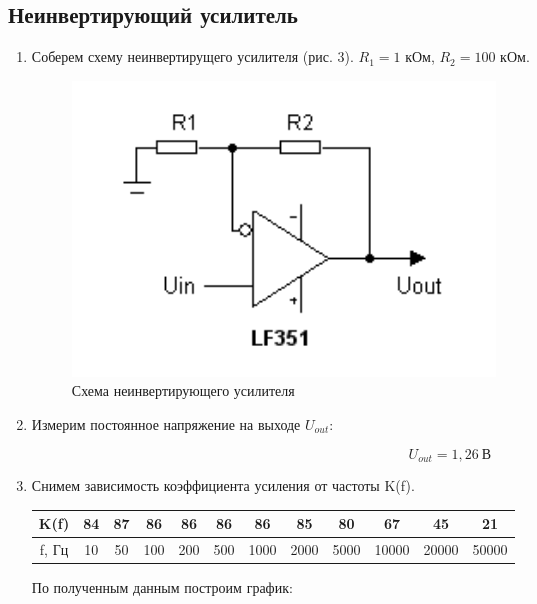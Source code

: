\documentclass[a4paper, 12pt]{article}%
\begin{document}
\subsection{Неинвертирующий усилитель}

\begin{enumerate}

\item Соберем схему неинвертирущего усилителя (рис. 3). $R_1	= 1$ кОм, $R_2 = 100$ кОм.

\begin{figure}[h!]
\centering
\includegraphics[scale=1]{images/scheme_2.png}
\caption{Схема неинвертирующего усилителя}
\label{fig:scheme_2}
\end{figure}

\item Измерим постоянное напряжение на выходе $U_{out}$:

\[U_{out} = 1,26 \: \text{В}\]

\item Снимем зависимость коэффициента усиления от частоты K(f).

\begin{center}
\begin{tabular}{|c|c|c|c|c|c|c|c|c|c|c|c|}
\hline 
K(f) & 84 & 87 & 86 & 86 & 86 & 86 & 85 & 80 & 67 & 45 & 21 \\ 
\hline 
f, Гц & 10 & 50 & 100 & 200 & 500 & 1000 & 2000 & 5000 & 10000 & 20000 & 50000\\ 
\hline 
\end{tabular} 
\end{center}

По полученным данным построим график:


\end{enumerate}
\end{document}
